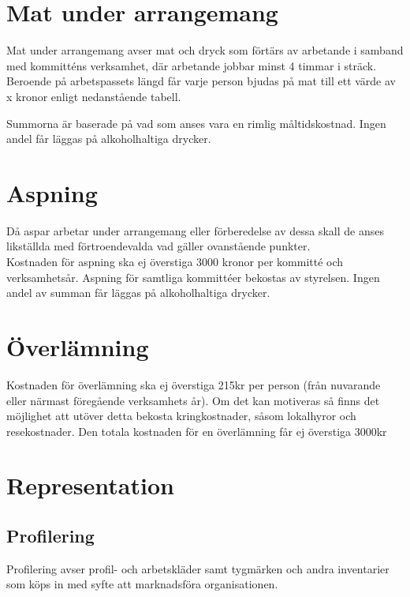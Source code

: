\documentclass[11pt, includeaddress]{classes/cthit}
\begin{document}
\section{Mat under arrangemang}
Mat under arrangemang avser mat och dryck som förtärs av arbetande i samband med kommitténs verksamhet, där arbetande jobbar minst 4 timmar i sträck. Beroende på arbetspassets längd får varje person bjudas på mat till ett värde av x kronor enligt nedanstående tabell.

\addvbuffer[\the\baselineskip]{\begin{tabular}{ l  c  c  c  c}
	\centering
	Timmar & [0-4] & (4-9] & (9-13] & (13-$\infty$] \\
	\hline
	Kronor & 0 & 30 & 60 & 90 \\
\end{tabular}}

Summorna är baserade på vad som anses vara en rimlig måltidskostnad. Ingen andel får läggas på alkoholhaltiga drycker.

\section{Aspning}
Då aspar arbetar under arrangemang eller förberedelse av dessa skall de anses likställda med förtroendevalda vad gäller ovanstående punkter. \\

Kostnaden för aspning ska ej överstiga 3000 kronor per kommitté och verksamhetsår.
Aspning för samtliga kommittéer bekostas av styrelsen. Ingen andel av summan får läggas på alkoholhaltiga drycker.

\section{Överlämning}
Kostnaden för överlämning ska ej överstiga 215kr per person (från nuvarande eller närmast föregående verksamhets år).
Om det kan motiveras så finns det möjlighet att utöver detta bekosta kringkostnader, såsom lokalhyror och resekostnader.
Den totala kostnaden för en överlämning får ej överstiga 3000kr

\section{Representation}

\subsection{Profilering}
Profilering avser profil- och arbetskläder samt tygmärken och andra inventarier som köps in med syfte att marknadsföra organisationen. \\
\end{document}
